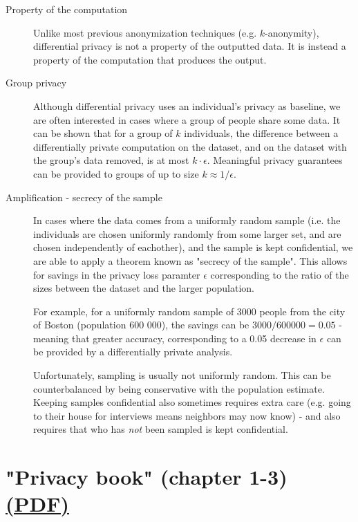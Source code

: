 \documentclass[a4paper]{article}
\begin{document}
\begin{description}
    \item[Property of the computation] Unlike most previous anonymization techniques (e.g. $k$-anonymity), differential privacy is not a property of the outputted data. It is instead a property of the computation that produces the output.
    
    \item[Group privacy] Although differential privacy uses an individual's privacy as baseline, we are often interested in cases where a group of people share some data. It can be shown that for a group of $k$ individuals, the difference between a differentially private computation on the dataset, and on the dataset with the group's data removed, is at most $k\cdot\epsilon$. Meaningful privacy guarantees can be provided to groups of up to size $k \approx 1/\epsilon.$
    
    \item[Amplification - secrecy of the sample] In cases where the data comes from a uniformly random sample (i.e. the individuals are chosen uniformly randomly from some larger set, and are chosen independently of eachother), and the sample is kept confidential, we are able to apply a theorem known as "secrecy of the sample". This allows for savings in the privacy loss paramter $\epsilon$ corresponding to the ratio of the sizes between the dataset and the larger population.
    
    For example, for a uniformly random sample of 3000 people from the city of Boston (population 600 000), the savings can be $3000/600000 = 0.05$ - meaning that greater accuracy, corresponding to a 0.05 decrease in $\epsilon$ can be provided by a differentially private analysis.
    
    Unfortunately, sampling is usually not uniformly random. This can be counterbalanced by being conservative with the population estimate. Keeping samples confidential also sometimes requires extra care (e.g. going to their house for interviews means neighbors may now know) - and also requires that who has \textit{not} been sampled is kept confidential.
\end{description}

\section{"Privacy book" (chapter 1-3) \hfill \href{https://www.cis.upenn.edu/~aaroth/Papers/privacybook.pdf}{(PDF)}}
\end{document}
